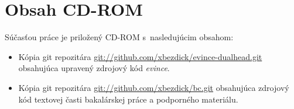\documentclass[12pt,oneside,final]{fithesis2}
\begin{document}
\appendix
\chapter{Obsah CD-ROM}
Súčasťou práce je priložený CD-ROM s~nasledujúcim obsahom:
\begin{itemize}
\item Kópia git repozitára \url{git://github.com/xbezdick/evince-dualhead.git} obsahujúca upravený zdrojový kód \emph{evince}.
\item Kópia git repozitára \url{git://github.com/xbezdick/bc.git} obsahujúca zdrojový kód textovej časti bakalárskej práce a podporného materiálu.
\end{itemize}
\raggedright


\end{document}
